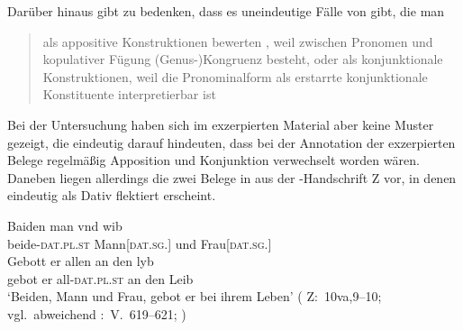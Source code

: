 Darüber hinaus gibt \citet{gjelsten1980} zu bedenken, dass es
uneindeutige Fälle von  gibt, die man
\blockcquote[187]{gjelsten1980}{als appositive Konstruktionen
bewerten , weil zwischen Pronomen und kopulativer Fügung
(Genus-)Kongruenz besteht, oder als konjunktionale Konstruktionen, weil die
Pronominalform als erstarrte konjunktionale Konstituente interpretierbar ist}.

Bei der Untersuchung haben sich im exzerpierten Material aber keine Muster
gezeigt, die eindeutig darauf hindeuten, dass bei der Annotation
der exzerpierten Belege regelmäßig Apposition und Konjunktion
verwechselt worden wären. Daneben liegen allerdings die zwei Belege in
 aus der \KC{}-Handschrift Z vor, in denen
 eindeutig als Dativ flektiert erscheint.

\begin{exe}
\ex \label{ex:kczbeidenundesynt1}
\begin{xlist}
	\ex \label{ex:kczbeidenundesynt1_1}
		\gll Baiden man vnd wib \\
			beide-\textsc{dat.pl\subMF.st} Mann[\textsc{dat.sg.\MascM}] und
				Frau[\textsc{dat.sg.\NeutF}] \\
	\sn \gll Gebott er allen an den lyb \\
			gebot er all-\textsc{dat.pl\subMF.st} an den Leib \\
		\trans `Beiden, Mann und Frau, gebot er bei ihrem Leben'
			(%
				Z:~10va,9--10; vgl.~abweichend
				\KC:~V.~619--621;
				\cite[92]{schroeder1895}%
			)

\end{xlist}
\end{exe}

